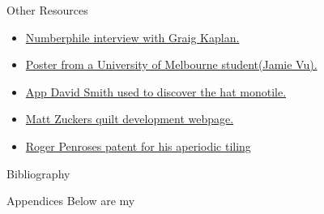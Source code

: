 \documentclass{beamer}
\begin{document}
\begin{frame}[allowframebreaks]{Other Resources}
    \begin{itemize}
        \item \href{https://www.youtube.com/watch?v=_ZS3Oqg1AX0&ab_channel=Numberphile}{Numberphile interview with Graig Kaplan.}
        \item \href{https://ms.unimelb.edu.au/__data/assets/pdf_file/0011/5218382/vujamie_296128_22162633_Jamie_Vu_Poster_final.pdf}{Poster from a University of Melbourne student(Jamie Vu).}
        \item \href{https://cs.uwaterloo.ca/~csk/spectre/app.html}{App David Smith used to discover the hat monotile.}
        \item \href{https://mzucker.github.io/2022/11/13/penrose-tiling-quilt.html}{Matt Zuckers quilt development webpage.}
        \item \href{https://patentimages.storage.googleapis.com/f2/9b/08/1b79cb4e4c0f3f/US4133152.pdf}{Roger Penroses patent for his aperiodic tiling}
    \end{itemize}
\end{frame}

    

\begin{frame}[allowframebreaks]{Bibliography}
  \footnotesize
  
  
\end{frame}



\begin{frame}{Appendices}
    Below are my
\end{frame}

% 
\end{document}

